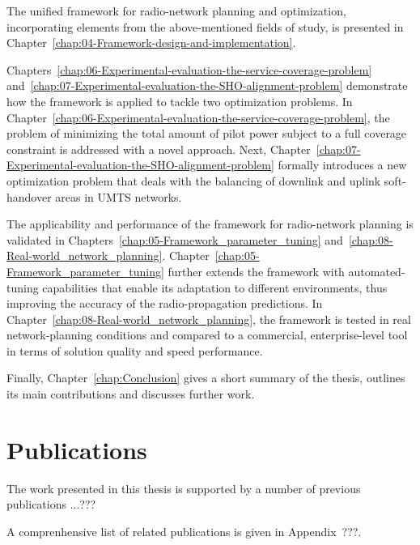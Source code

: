 The unified framework for radio-network planning and optimization,
incorporating elements from the above-mentioned fields of study, is
presented in Chapter~\ref{chap:04-Framework-design-and-implementation}.

Chapters~\ref{chap:06-Experimental-evaluation-the-service-coverage-problem}
and~\ref{chap:07-Experimental-evaluation-the-SHO-alignment-problem}
demonstrate how the framework is applied to tackle two optimization
problems. In Chapter~\ref{chap:06-Experimental-evaluation-the-service-coverage-problem},
the problem of minimizing the total amount of pilot power subject
to a full coverage constraint is addressed with a novel approach.
Next, Chapter~\ref{chap:07-Experimental-evaluation-the-SHO-alignment-problem}
formally introduces a new optimization problem that deals with the
balancing of downlink and uplink soft-handover areas in UMTS networks.

The applicability and performance of the framework for radio-network
planning is validated in Chapters~\ref{chap:05-Framework_parameter_tuning}
and~\ref{chap:08-Real-world_network_planning}. Chapter~\ref{chap:05-Framework_parameter_tuning}
further extends the framework with automated-tuning capabilities that
enable its adaptation to different environments, thus improving the
accuracy of the radio-propagation predictions. In Chapter~\ref{chap:08-Real-world_network_planning},
the framework is tested in real network-planning conditions and compared
to a commercial, enterprise-level tool in terms of solution quality
and speed performance.

Finally, Chapter~\ref{chap:Conclusion} gives a short summary of
the thesis, outlines its main contributions and discusses further
work.


\section{Publications }

The work presented in this thesis is supported by a number of previous
publications ...???

A comprenhensive list of related publications is given in Appendix~???.


